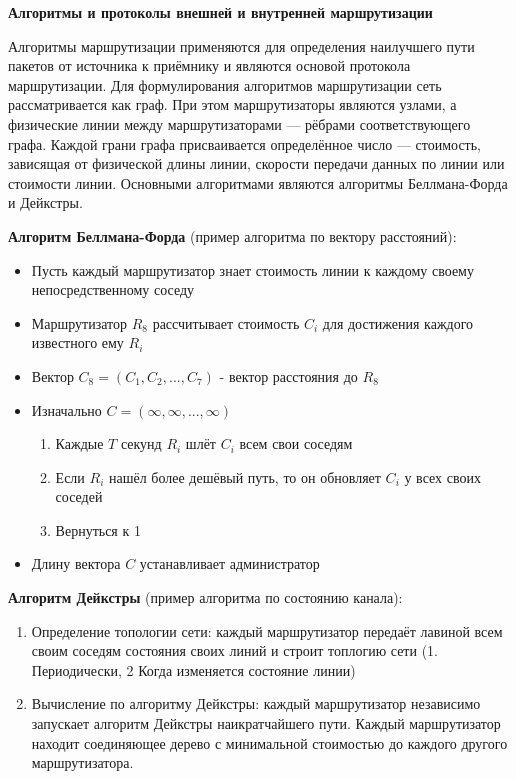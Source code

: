 

\bigbreak
\textbf{Алгоритмы и протоколы внешней и внутренней маршрутизации}

Алгоритмы маршрутизации применяются для определения наилучшего пути пакетов от источника к приёмнику и являются основой протокола маршрутизации. 
Для формулирования алгоритмов маршрутизации сеть рассматривается как граф. 
При этом маршрутизаторы являются узлами, а физические линии между маршрутизаторами --- рёбрами соответствующего графа.
Каждой грани графа присваивается определённое число --- стоимость, зависящая от физической длины линии, скорости передачи данных по линии или стоимости линии.
Основными алгоритмами являются алгоритмы Беллмана-Форда и Дейкстры.

\textbf{Алгоритм Беллмана-Форда} (пример алгоритма по вектору расстояний):

\begin{itemize}
    \item Пусть каждый маршрутизатор знает стоимость линии к каждому своему непосредственному соседу
    \item Маршрутизатор $R_8$ рассчитывает стоимость $C_i$ для достижения каждого известного ему $R_i$
    \item Вектор $C_8 = (C_1,C_2,...,C_7)$ - вектор расстояния до $R_8$
    \item Изначально $C = (\infty,\infty,...,\infty)$
    \begin{enumerate}
        \item Каждые $T$ секунд $R_i$ шлёт $C_i$ всем свои соседям
        \item Если $R_i$ нашёл более дешёвый путь, то он обновляет $C_i$ у всех своих соседей
        \item Вернуться к 1
    \end{enumerate}
    \item Длину вектора $C$ устанавливает администратор
\end{itemize}

\textbf{Алгоритм Дейкстры} (пример алгоритма по состоянию канала):

\begin{enumerate}
    \item Определение топологии сети: каждый маршрутизатор передаёт лавиной всем своим соседям состояния своих линий и строит топлогию сети (1. Периодически, 2 Когда изменяется состояние линии)
    \item Вычисление по алгоритму Дейкстры: каждый маршрутизатор независимо запускает алгоритм Дейкстры наикратчайшего пути.
    Каждый маршрутизатор находит соединяющее дерево с минимальной стоимостью до каждого другого маршрутизатора.
\end{enumerate}

